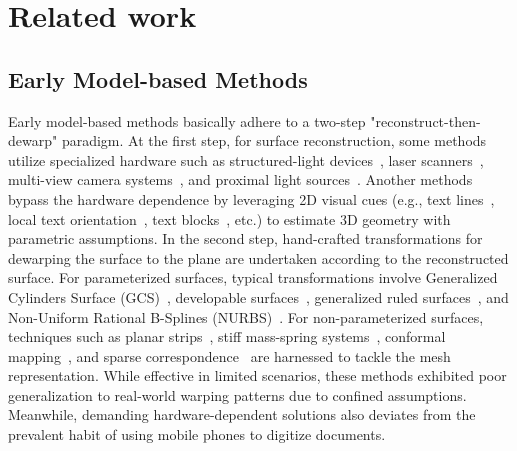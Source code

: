 \section{Related work}
\label{sec:related}
\subsection{Early Model-based Methods}
Early model-based methods basically adhere to a two-step "reconstruct-then-dewarp" paradigm. At the first step, for surface reconstruction, some methods utilize specialized hardware such as structured-light devices~\cite{RN26, RN21}, laser scanners~\cite{RN29}, multi-view camera systems~\cite{Ulges_2004, koo2009composition, RN11}, and proximal light sources~\cite{RN23}. Another methods bypass the hardware dependence by leveraging 2D visual cues (e.g., text lines~\cite{tian2011rectification}, local text orientation~\cite{RN18}, text blocks~\cite{RN16}, etc.) to estimate 3D geometry with parametric assumptions. 
In the second step, hand-crafted transformations for dewarping the surface to the plane are undertaken according to the reconstructed surface. For parameterized surfaces, typical transformations involve Generalized Cylinders Surface (GCS)~\cite{RN13, koo2009composition}, developable surfaces~\cite{RN19}, generalized ruled surfaces~\cite{Tsoi_2007}, and Non-Uniform Rational B-Splines (NURBS)~\cite{tan2005restoring}. For non-parameterized surfaces, techniques such as planar strips~\cite{RN20}, stiff mass-spring systems~\cite{RN29}, conformal mapping~\cite{RN11}, and sparse correspondence~\cite{RN18} are harnessed to tackle the mesh representation.
While effective in limited scenarios, these methods exhibited poor generalization to real-world warping patterns due to confined assumptions. Meanwhile, demanding hardware-dependent solutions also deviates from the prevalent habit of using mobile phones to digitize documents.



